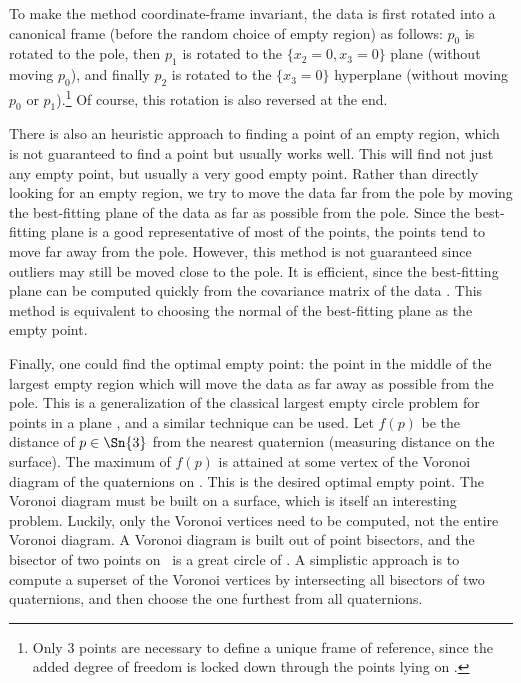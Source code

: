 To make the method coordinate-frame invariant,
the data is first rotated into a canonical frame 
(before the random choice of empty region) as follows:
$p_0$ is rotated to the pole, 
then $p_1$ is rotated to the $\{x_2=0,x_3=0\}$ plane (without moving $p_0$),
and finally $p_2$ is rotated to the $\{x_3=0\}$ hyperplane
(without moving $p_0$ or $p_1$).\footnote{Only
	3 points are necessary to define a unique frame of reference,
	since the added degree of freedom is locked down through
	the points lying on .}
Of course, this rotation is also reversed at the end.

There is also an heuristic approach to finding a point of an
empty region, which is not guaranteed to find a point
but usually works well.
This will find not just any empty point, but usually a very good empty
point.
Rather than directly looking for an empty region, we
try to move the data far from the pole by moving the best-fitting plane
of the data as far as possible from the pole.
Since the best-fitting plane is a good representative of most of the
points, the points tend to move far away from the pole.
However, this method is not guaranteed 
since outliers may still be moved close to the pole.
It is efficient, since the best-fitting plane can be computed
quickly from the covariance matrix of the data \cite{ballard82}.
This method is equivalent to choosing the normal of the best-fitting plane
as the empty point.

Finally, one could find the optimal empty point:
the point in the middle of the largest 
empty region which will move the data 
as far away as possible from the pole.
This is a generalization of the classical largest empty circle
problem for points in a plane \cite{shamos85}, 
and a similar technique can be used.
Let $f(p)$ be the distance of $p \in \Sn{3}$ from the nearest quaternion
(measuring distance on the surface).
The maximum of $f(p)$ 
is attained at some vertex of the Voronoi diagram of the quaternions on
.
This is the desired optimal empty point.
The Voronoi diagram must be built on a surface, which 
is itself an interesting problem.
Luckily, only the Voronoi vertices need to be computed,
not the entire Voronoi diagram.
A Voronoi diagram is built out of point bisectors, and
the bisector of two points on \ is a great circle of .
A simplistic approach is to compute a superset of the Voronoi vertices
by intersecting all bisectors of two quaternions, and then 
choose the one furthest from all quaternions.

